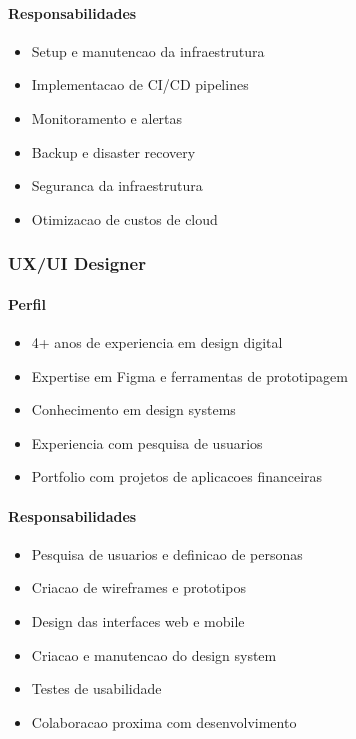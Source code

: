 \paragraph{Responsabilidades}
\begin{itemize}
    \item Setup e manutencao da infraestrutura
    \item Implementacao de CI/CD pipelines
    \item Monitoramento e alertas
    \item Backup e disaster recovery
    \item Seguranca da infraestrutura
    \item Otimizacao de custos de cloud
\end{itemize}

\subsubsection{UX/UI Designer}
\paragraph{Perfil}
\begin{itemize}
    \item 4+ anos de experiencia em design digital
    \item Expertise em Figma e ferramentas de prototipagem
    \item Conhecimento em design systems
    \item Experiencia com pesquisa de usuarios
    \item Portfolio com projetos de aplicacoes financeiras
\end{itemize}

\paragraph{Responsabilidades}
\begin{itemize}
    \item Pesquisa de usuarios e definicao de personas
    \item Criacao de wireframes e prototipos
    \item Design das interfaces web e mobile
    \item Criacao e manutencao do design system
    \item Testes de usabilidade
    \item Colaboracao proxima com desenvolvimento
\end{itemize}

